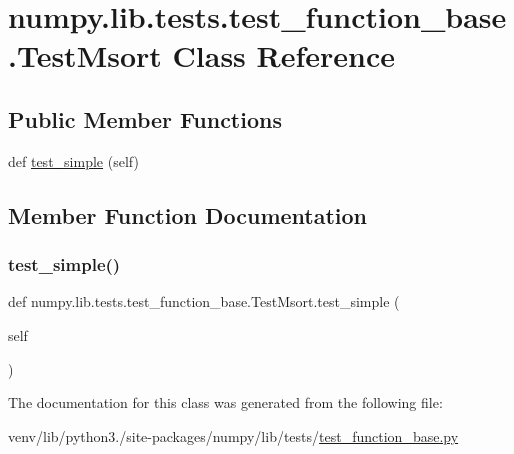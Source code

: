 \hypertarget{classnumpy_1_1lib_1_1tests_1_1test__function__base_1_1TestMsort}{}\section{numpy.\+lib.\+tests.\+test\+\_\+function\+\_\+base.\+Test\+Msort Class Reference}
\label{classnumpy_1_1lib_1_1tests_1_1test__function__base_1_1TestMsort}
\subsection*{Public Member Functions}
\begin{DoxyCompactItemize}
\item 
def \hyperlink{classnumpy_1_1lib_1_1tests_1_1test__function__base_1_1TestMsort_ab901546a7f15ca3ffaad8be5a6821239}{test\+\_\+simple} (self)
\end{DoxyCompactItemize}


\subsection{Member Function Documentation}
\mbox{\label{classnumpy_1_1lib_1_1tests_1_1test__function__base_1_1TestMsort_ab901546a7f15ca3ffaad8be5a6821239}} 
\subsubsection{\texorpdfstring{test\+\_\+simple()}{test\_simple()}}
{\footnotesize\ttfamily def numpy.\+lib.\+tests.\+test\+\_\+function\+\_\+base.\+Test\+Msort.\+test\+\_\+simple (\begin{DoxyParamCaption}\item[{}]{self }\end{DoxyParamCaption})}



The documentation for this class was generated from the following file\+:\begin{DoxyCompactItemize}
\item 
venv/lib/python3./site-\/packages/numpy/lib/tests/\hyperlink{lib_2tests_2test__function__base_8py}{test\+\_\+function\+\_\+base.\+py}\end{DoxyCompactItemize}
